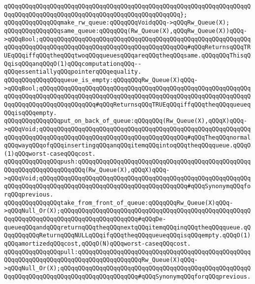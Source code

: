 \verb|qQQqqQQqqQQqqQQqqQQqqQQqqQQqqQQqqQQqqQQqqQQqqQQqqQQqqQQqqQQqqQQqqQQqqQQqqQQqqQQqqQQqqQQqqQQqqQQqqQQqqQQqqQQqqQQqqQQqqQQq};|\newline
\newline
\verb|qQQqqQQqqQQqqQQqmake_rw_queue:qQQqqQQqVoidqQQq->qQQqRw_Queue(X);|\newline
\newline
\verb|qQQqqQQqqQQqqQQqsame_queue:qQQqqQQq(Rw_Queue(X),qQQqRw_Queue(X))qQQq->qQQqBool;qQQqqQQqqQQqqQQqqQQqqQQqqQQqqQQqqQQqqQQqqQQqqQQqqQQqqQQqqQQqqQQqqQQqqQQqqQQqqQQqqQQqqQQqqQQqqQQqqQQqqQQqqQQqqQQq#qQQqReturnsqQQqTRUEqQQqiffqQQqtheqQQqtwoqQQqqueuesqQQqareqQQqtheqQQqsame.qQQqqQQqThisqQQqisqQQqanqQQqO(1)qQQqcomputationqQQq--qQQqessentiallyqQQqpointerqQQqequality.|\newline
\newline
\verb|qQQqqQQqqQQqqQQqqueue_is_empty:qQQqqQQqRw_Queue(X)qQQq->qQQqBool;qQQqqQQqqQQqqQQqqQQqqQQqqQQqqQQqqQQqqQQqqQQqqQQqqQQqqQQqqQQqqQQqqQQqqQQqqQQqqQQqqQQqqQQqqQQqqQQqqQQqqQQqqQQqqQQqqQQqqQQqqQQqqQQqqQQqqQQqqQQqqQQqqQQqqQQqqQQq#qQQqReturnsqQQqTRUEqQQqiffqQQqtheqQQqqueueqQQqisqQQqempty.|\newline
\newline
\verb|qQQqqQQqqQQqqQQqput_on_back_of_queue:qQQqqQQq(Rw_Queue(X),qQQqX)qQQq->qQQqVoid;qQQqqQQqqQQqqQQqqQQqqQQqqQQqqQQqqQQqqQQqqQQqqQQqqQQqqQQqqQQqqQQqqQQqqQQqqQQqqQQqqQQqqQQqqQQqqQQqqQQqqQQqqQQqqQQq#qQQqTheqQQqnormalqQQqwayqQQqofqQQqinsertingqQQqanqQQqitemqQQqintoqQQqtheqQQqqueue.qQQqO(1)qQQqworst-caseqQQqcost.|\newline
\verb|qQQqqQQqqQQqqQQqpush:qQQqqQQqqQQqqQQqqQQqqQQqqQQqqQQqqQQqqQQqqQQqqQQqqQQqqQQqqQQqqQQqqQQqqQQq(Rw_Queue(X),qQQqX)qQQq->qQQqVoid;qQQqqQQqqQQqqQQqqQQqqQQqqQQqqQQqqQQqqQQqqQQqqQQqqQQqqQQqqQQqqQQqqQQqqQQqqQQqqQQqqQQqqQQqqQQqqQQqqQQqqQQqqQQqqQQq#qQQqSynonymqQQqforqQQqprevious.|\newline
\newline
\verb|qQQqqQQqqQQqqQQqtake_from_front_of_queue:qQQqqQQqRw_Queue(X)qQQq->qQQqNull_Or(X);qQQqqQQqqQQqqQQqqQQqqQQqqQQqqQQqqQQqqQQqqQQqqQQqqQQqqQQqqQQqqQQqqQQqqQQqqQQqqQQqqQQqqQQqqQQq#qQQqDe-queueqQQqandqQQqreturnqQQqtheqQQqnextqQQqitemqQQqinqQQqtheqQQqqueue.qQQqqQQqqQQqReturnqQQqNULLqQQqifqQQqtheqQQqqueueqQQqisqQQqempty.qQQqO(1)qQQqamortizedqQQqcost,qQQqO(N)qQQqworst-caseqQQqcost.|\newline
\verb|qQQqqQQqqQQqqQQqpull:qQQqqQQqqQQqqQQqqQQqqQQqqQQqqQQqqQQqqQQqqQQqqQQqqQQqqQQqqQQqqQQqqQQqqQQqqQQqqQQqqQQqqQQqRw_Queue(X)qQQq->qQQqNull_Or(X);qQQqqQQqqQQqqQQqqQQqqQQqqQQqqQQqqQQqqQQqqQQqqQQqqQQqqQQqqQQqqQQqqQQqqQQqqQQqqQQqqQQqqQQqqQQq#qQQqSynonymqQQqforqQQqprevious.|\newline
